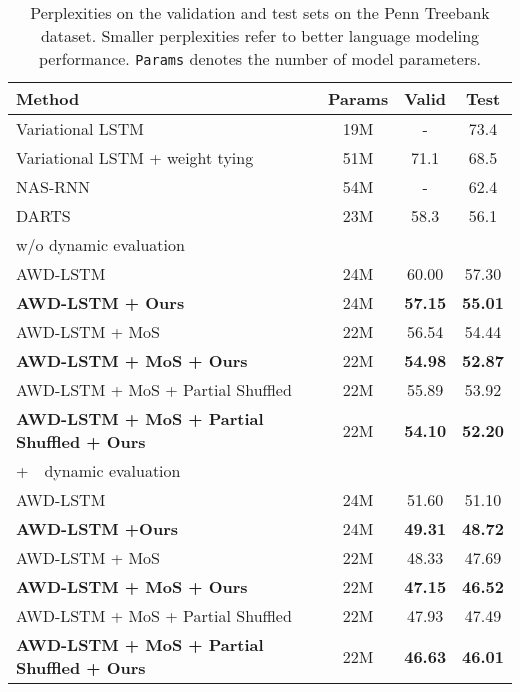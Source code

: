 \documentclass{article}
\begin{document}
\begin{table*}[ht]
\begin{center}
    \setlength{\tabcolsep}{1.2em}
        \begin{tabular}{l|c||cc}
            \toprule
            Method & \bf Params & Valid & Test \\
            \hline
            Variational LSTM~\cite{gal2016theoretically} & 19M & - & 73.4 \\
            Variational LSTM + weight tying~\cite{inan2016tying} & 51M & 71.1 & 68.5 \\
            NAS-RNN~\cite{zoph2016neural} & 54M & - & 62.4 \\
            DARTS~\cite{liu2018darts} & 23M & 58.3 & 56.1 \\
            \hline
            \multicolumn{4}{l}{w/o dynamic evaluation} \\ 
            \hline
            AWD-LSTM ~\citep{merity2017regularizing} & 24M & 60.00 & 57.30\\
            \bf{AWD-LSTM + Ours} & 24M & \bf{57.15} & \bf{55.01}\\
AWD-LSTM + MoS \citep{yang2017breaking} & 22M & 56.54 & 54.44 \\
            \bf AWD-LSTM + MoS + Ours & 22M & \bf{54.98} & \bf{52.87} \\
            AWD-LSTM + MoS + Partial Shuffled \citep{press2019partially} & 22M & 55.89 & 53.92 \\
            \bf AWD-LSTM + MoS + Partial Shuffled + Ours & 22M & \bf{54.10} & \bf{52.20} \\
\hline
            \multicolumn{4}{l}{+~~dynamic evaluation \citep{krause2017dynamic}} \\ 
            \hline
            AWD-LSTM 
            ~\citep{merity2017regularizing}   & 24M & 51.60 & 51.10\\
            \bf{AWD-LSTM +Ours}  & 24M & \bf{49.31} & \bf{48.72}\\
AWD-LSTM + MoS 
            \citep{yang2017breaking}  & 22M & 48.33 & 47.69 \\
            \bf AWD-LSTM + MoS + Ours & 22M & \bf{47.15} & \bf{46.52} \\
            AWD-LSTM + MoS + Partial Shuffled \citep{press2019partially} & 22M & 47.93 & 47.49 \\
            \bf AWD-LSTM + MoS + Partial Shuffled + Ours & 22M & \bf{46.63} & \bf{46.01} \\
            \bottomrule
        \end{tabular}
    \end{center}
\caption{\label{PTB-table}
Perplexities on the validation and test sets on the Penn Treebank dataset.  Smaller perplexities refer to better language modeling performance. {\tt Params} denotes the number of model parameters. 
}
\end{table*}
\end{document}
